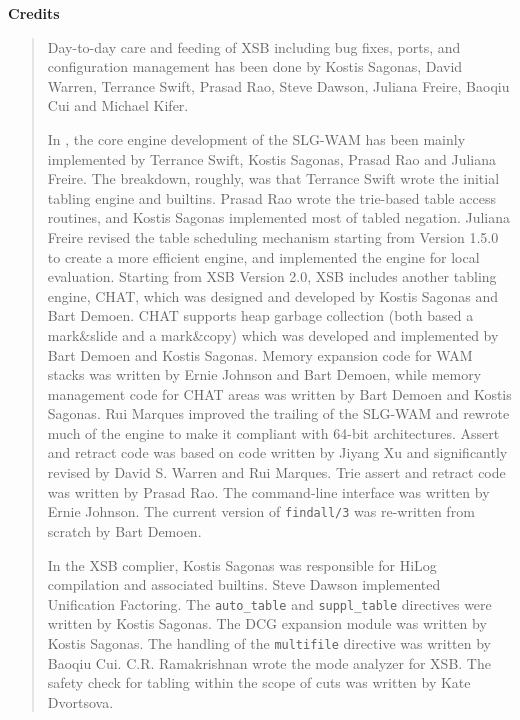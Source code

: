 \begin{center}
{\bf {\Large 
		Credits
}}
\end{center}


\begin{quote}
Day-to-day care and feeding of XSB including bug fixes, ports, and
configuration management has been done by Kostis Sagonas, David
Warren, Terrance Swift, Prasad Rao, Steve Dawson, Juliana Freire, 
Baoqiu Cui and Michael Kifer.

In \version, the core engine development of the SLG-WAM has been
mainly implemented by Terrance Swift, Kostis Sagonas, Prasad Rao and
Juliana Freire.  The breakdown, roughly, was that Terrance Swift wrote
the initial tabling engine and builtins.  Prasad Rao wrote the
trie-based table access routines, and Kostis Sagonas implemented most
of tabled negation.  Juliana Freire revised the table scheduling
mechanism starting from Version 1.5.0 to create a more efficient
engine, and implemented the engine for local evaluation.  Starting
from XSB Version 2.0, XSB includes another tabling engine, CHAT, which
was designed and developed by Kostis Sagonas and Bart Demoen.  CHAT
supports heap garbage collection (both based a mark\&slide and a
mark\&copy) which was developed and implemented by Bart Demoen and
Kostis Sagonas.  Memory expansion code for WAM stacks was written by
Ernie Johnson and Bart Demoen, while memory management code for CHAT
areas was written by Bart Demoen and Kostis Sagonas.  Rui Marques
improved the trailing of the SLG-WAM and rewrote much of the engine to
make it compliant with 64-bit architectures.  Assert and retract code
was based on code written by Jiyang Xu and significantly revised by
David S. Warren and Rui Marques.  Trie assert and retract code was
written by Prasad Rao.  The command-line interface was written by
Ernie Johnson.  The current version of {\tt findall/3} was re-written
from scratch by Bart Demoen.

In the XSB complier, Kostis Sagonas was responsible for HiLog
compilation and associated builtins.  Steve Dawson implemented
Unification Factoring.  The {\tt auto\_table} and {\tt suppl\_table}
directives were written by Kostis Sagonas.  The DCG expansion module
was written by Kostis Sagonas.  The handling of the {\tt multifile}
directive was written by Baoqiu Cui.  C.R. Ramakrishnan wrote the mode
analyzer for XSB.  The safety check for tabling within the scope of
cuts was written by Kate Dvortsova.


\end{quote}
